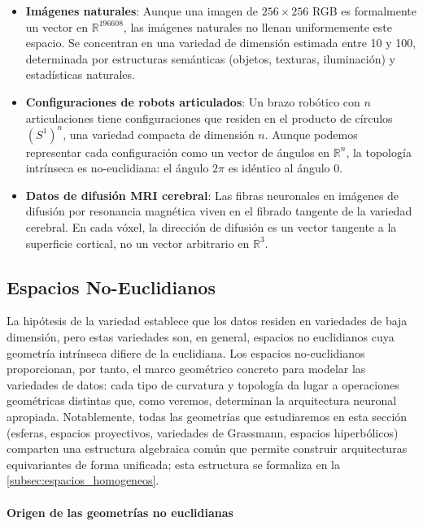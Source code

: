 \begin{itemize}
    \item \textbf{Imágenes naturales}: Aunque una imagen de $256 \times 256$ RGB es formalmente un vector en $\mathbb{R}^{196608}$, las imágenes naturales no llenan uniformemente este espacio. Se concentran en una variedad de dimensión estimada entre 10 y 100, determinada por estructuras semánticas (objetos, texturas, iluminación) y estadísticas naturales.

    \item \textbf{Configuraciones de robots articulados}: Un brazo robótico con $n$ articulaciones tiene configuraciones que residen en el producto de círculos $(S^1)^n$, una variedad compacta de dimensión $n$. Aunque podemos representar cada configuración como un vector de ángulos en $\mathbb{R}^n$, la topología intrínseca es no-euclidiana: el ángulo $2\pi$ es idéntico al ángulo $0$.

    \item \textbf{Datos de difusión MRI cerebral}: Las fibras neuronales en imágenes de difusión por resonancia magnética viven en el fibrado tangente de la variedad cerebral. En cada vóxel, la dirección de difusión es un vector tangente a la superficie cortical, no un vector arbitrario en $\mathbb{R}^3$.
\end{itemize}

\subsection{Espacios No-Euclidianos}\label{subsec:espacios_no_euclidianos}

La hipótesis de la variedad establece que los datos residen en variedades de baja dimensión, pero estas variedades son, en general, espacios no euclidianos cuya geometría intrínseca difiere de la euclidiana. Los espacios no-euclidianos proporcionan, por tanto, el marco geométrico concreto para modelar las variedades de datos: cada tipo de curvatura y topología da lugar a operaciones geométricas distintas que, como veremos, determinan la arquitectura neuronal apropiada. Notablemente, todas las geometrías que estudiaremos en esta sección (esferas, espacios proyectivos, variedades de Grassmann, espacios hiperbólicos) comparten una estructura algebraica común que permite construir arquitecturas equivariantes de forma unificada; esta estructura se formaliza en la \autoref{subsec:espacios_homogeneos}.

\paragraph{Origen de las geometrías no euclidianas}

